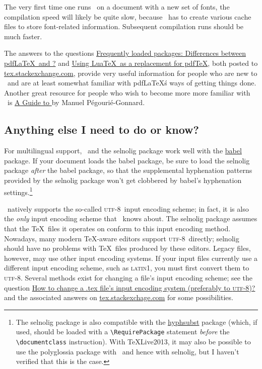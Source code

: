 \documentclass[11pt]{article}
\newcommand{\pkg}[1]{\textsf{#1}}
\newcommand\utf{\textsc{utf-8}}
\begin{document}
The very first time one runs \LuaLaTeX\ on a document with a new set of fonts, the compilation speed will likely be quite slow, because \LuaLaTeX\ has to create various cache files to store font-related information. Subsequent compilation runs should be much faster. 

The answers to the questions \href{http://tex.stackexchange.com/q/28642/5001}{Frequently loaded packages: Differences between pdf\LaTeX\ and \LuaLaTeX?} and \href{http://tex.stackexchange.com/q/32295/5001}{Using Lua\TeX\ as a replacement for pdf\TeX}, both posted to \href{http://tex.stackexchange.com/}{tex.stackexchange.com}, provide very useful information for people who are new to \LuaLaTeX\ and are at least somewhat familiar with pdf\LaTeX\'s ways of getting things done. Another great resource for people who wish to become more more familiar with \LuaLaTeX\ is \href{http://mirror.ctan.org/info/luatex/lualatex-doc/lualatex-doc.pdf}{A Guide to \LuaLaTeX} by Manuel Pégourié-Gonnard.


\subsection{Anything else I need to do or know?} \label{sec:anythingelse}

For multilingual support, \LuaLaTeX\ and the \pkg{selnolig} package work well with the \href{http://www.ctan.org/pkg/babel}{\pkg{babel}} package. If your document loads the \pkg{babel} package, be sure to load the \pkg{selnolig} package \emph{after} the \pkg{babel} package, so that the supplemental hyphenation patterns provided by the \pkg{selnolig} package won't get clobbered by \pkg{babel}'s hyphenation settings.\footnote{The \pkg{selnolig} package is also compatible with the \href{http://www.ctan.org/pkg/hyphsubst}{\pkg{hyphsubst}} package (which, if used, should be loaded with a \Verb+\RequirePackage+ statement \emph{before} the \Verb+\documentclass+ instruction). With \TeX Live2013, it may also be possible to use the \pkg{polyglossia} package with \LuaLaTeX\ and hence with \pkg{selnolig}, but I haven't verified that this is the case.}

\LuaLaTeX\ natively supports the so-called \utf\ input encoding scheme; in fact, it is also the \emph{only} input encoding scheme that \LuaLaTeX\ knows about. The \pkg{selnolig} package assumes that the \TeX\ files it operates on conform to this input encoding method. Nowadays, many modern \TeX-aware editors support \utf\ directly; \pkg{selnolig} should have no problems with \TeX\ files produced by these editors. Legacy files, however, may use other input encoding systems. If your input files currently use a different input encoding scheme, such as \textsc{latin1}, you must first convert them to \utf. Several methods exist for changing a file's input encoding scheme; see the question \href{http://tex.stackexchange.com/q/87406/5001}{How to change a .tex file's input encoding system (preferably to \utf)?} and the associated answers on \url{tex.stackexchage.com} for some possibilities.
\end{document}
